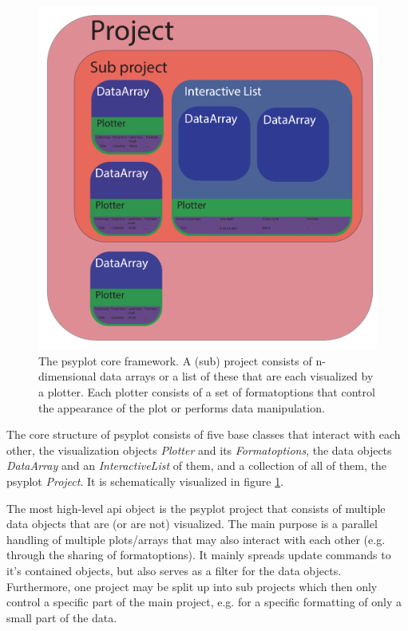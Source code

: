 \begin{refsection}
\begin{figure}
	\includegraphics[width=\linewidth]{psyplot-figures/psyplot_framework.pdf}
	\caption[The psyplot core framework]{The psyplot core framework. A (sub) project consists of n-dimensional data arrays or a list of these that are each visualized by a plotter. Each plotter consists of a set of formatoptions that control the appearance of the plot or performs data manipulation.}
	\label{fig:psyplot-core}
\end{figure}

The core structure of psyplot consists of five base classes that interact with each other, the visualization objects \textit{Plotter} and its \textit{Formatoptions}, the data objects \textit{DataArray} and an \textit{InteractiveList} of them, and a collection of all of them, the psyplot \textit{Project}. It is schematically visualized in figure \ref{fig:psyplot-core}.

The most high-level \gls{api} object is the psyplot project that consists of multiple data objects that are (or are not) visualized. The main purpose is a parallel handling of multiple plots/arrays that may also interact with each other (e.g. through the sharing of formatoptions). It mainly spreads update commands to it's contained objects, but also serves as a filter for the data objects. Furthermore, one project may be split up into sub projects which then only control a specific part of the main project, e.g. for a specific formatting of only a small part of the data.


\end{refsection}

